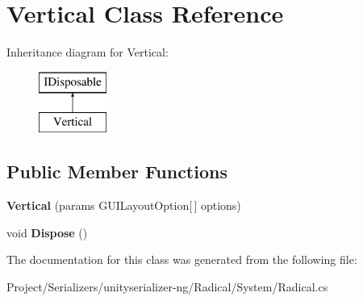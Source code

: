 \hypertarget{class_vertical}{}\section{Vertical Class Reference}
\label{class_vertical}
Inheritance diagram for Vertical\+:\begin{figure}[H]
\begin{center}
\leavevmode
\includegraphics[height=2.000000cm]{class_vertical}
\end{center}
\end{figure}
\subsection*{Public Member Functions}
\begin{DoxyCompactItemize}
\item 
\mbox{\label{class_vertical_aaee460a9350081c85120865887dd588e}} 
{\bfseries Vertical} (params G\+U\+I\+Layout\+Option\mbox{[}$\,$\mbox{]} options)
\item 
\mbox{\label{class_vertical_a3329b58e37483e88511f34f2fe7eea72}} 
void {\bfseries Dispose} ()
\end{DoxyCompactItemize}


The documentation for this class was generated from the following file\+:\begin{DoxyCompactItemize}
\item 
Project/\+Serializers/unityserializer-\/ng/\+Radical/\+System/Radical.\+cs\end{DoxyCompactItemize}

